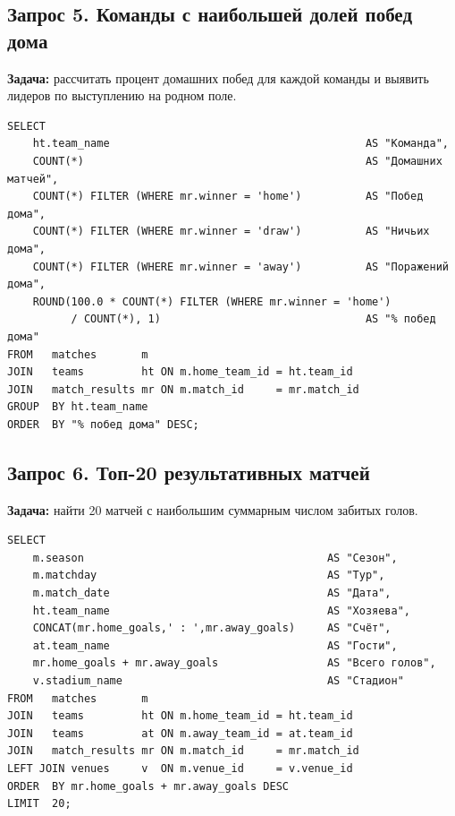 \documentclass[14pt,a4paper]{extarticle}
\begin{document}
\subsection{Запрос 5. Команды с наибольшей долей побед дома}

\textbf{Задача:} рассчитать процент домашних побед для каждой команды и
выявить лидеров по выступлению на родном поле.

\begin{listing}[H]
\caption{Доля домашних побед по командам}
\begin{verbatim}
SELECT
    ht.team_name                                        AS "Команда",
    COUNT(*)                                            AS "Домашних матчей",
    COUNT(*) FILTER (WHERE mr.winner = 'home')          AS "Побед дома",
    COUNT(*) FILTER (WHERE mr.winner = 'draw')          AS "Ничьих дома",
    COUNT(*) FILTER (WHERE mr.winner = 'away')          AS "Поражений дома",
    ROUND(100.0 * COUNT(*) FILTER (WHERE mr.winner = 'home')
          / COUNT(*), 1)                                AS "% побед дома"
FROM   matches       m
JOIN   teams         ht ON m.home_team_id = ht.team_id
JOIN   match_results mr ON m.match_id     = mr.match_id
GROUP  BY ht.team_name
ORDER  BY "% побед дома" DESC;
\end{verbatim}
\end{listing}

\subsection{Запрос 6. Топ-20 результативных матчей}

\textbf{Задача:} найти 20 матчей с наибольшим суммарным числом забитых голов.

\begin{listing}[H]
\caption{Топ-20 матчей по количеству голов}
\begin{verbatim}
SELECT
    m.season                                      AS "Сезон",
    m.matchday                                    AS "Тур",
    m.match_date                                  AS "Дата",
    ht.team_name                                  AS "Хозяева",
    CONCAT(mr.home_goals,' : ',mr.away_goals)     AS "Счёт",
    at.team_name                                  AS "Гости",
    mr.home_goals + mr.away_goals                 AS "Всего голов",
    v.stadium_name                                AS "Стадион"
FROM   matches       m
JOIN   teams         ht ON m.home_team_id = ht.team_id
JOIN   teams         at ON m.away_team_id = at.team_id
JOIN   match_results mr ON m.match_id     = mr.match_id
LEFT JOIN venues     v  ON m.venue_id     = v.venue_id
ORDER  BY mr.home_goals + mr.away_goals DESC
LIMIT  20;
\end{verbatim}
\end{listing}
\end{document}
